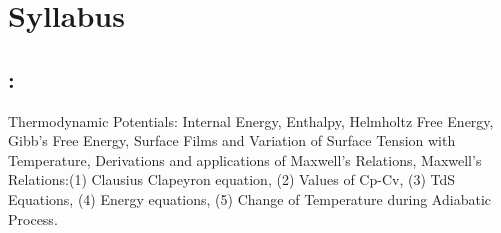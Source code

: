 \section*{Syllabus}

    \subsection*{\topicSubTitle: \topicTitle}
        Thermodynamic Potentials: Internal Energy, Enthalpy, Helmholtz Free Energy, Gibb's Free Energy, Surface Films and Variation of Surface Tension with Temperature, Derivations and applications of Maxwell’s Relations, Maxwell’s Relations:(1) Clausius Clapeyron equation, (2) Values of Cp-Cv, (3) TdS Equations, (4) Energy equations, (5) Change of Temperature during Adiabatic Process.